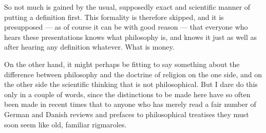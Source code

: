 \documentclass[12pt]{article}
\newcommand{\opage}[1]{\marginnote{\footnotesize\textit{[#1]}}}
\begin{document}
So not much is gained by the usual, supposedly exact and scientific manner of putting a definition first. This formality is therefore skipped, and it is presupposed --- as of course it can be with good reason --- that everyone who hears these presentations knows what philosophy is, and knows it just as well as after hearing any definition whatever. What is money. %

On the other hand, it might perhaps be fitting to say something about the difference between philosophy and the doctrine of religion on the one side, and on the other side the scientific\opage{2r} thinking that is not philosophical. But I dare do this only in a couple of words, since the distinctions to be made here have so often been made in recent times that to anyone who has merely read a fair number of German and Danish reviews and prefaces to philosophical treatises they must soon seem like old, familiar rigmaroles.
\end{document}
